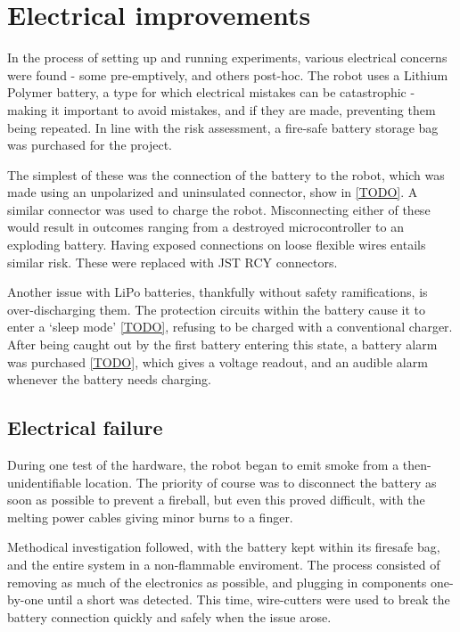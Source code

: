 \documentclass[main.tex]{subfiles}
\begin{document}
\section{Electrical improvements}

In the process of setting up and running experiments, various electrical concerns were found - some pre-emptively, and others post-hoc. The robot uses a Lithium Polymer battery, a type for which electrical mistakes can be catastrophic \cite{bbc-samsung-explosion} - making it important to avoid mistakes, and if they are made, preventing them being repeated. In line with the risk assessment, a fire-safe battery storage bag was purchased for the project.

The simplest of these was the connection of the battery to the robot, which was made using an unpolarized and uninsulated connector, show in \cref{TODO}. A similar connector was used to charge the robot. Misconnecting either of these would result in outcomes ranging from a destroyed microcontroller to an exploding battery. Having exposed connections on loose flexible wires entails similar risk. These were replaced with JST RCY connectors.

Another issue with LiPo batteries, thankfully without safety ramifications, is over-discharging them. The protection circuits within the battery cause it to enter a `sleep mode' \ref{TODO}, refusing to be charged with a conventional charger. After being caught out by the first battery entering this state, a battery alarm was purchased \cref{TODO}, which gives a voltage readout, and an audible alarm whenever the battery needs charging.

\subsection{Electrical failure}

During one test of the hardware, the robot began to emit smoke from a then-unidentifiable location. The priority of course was to disconnect the battery as soon as possible to prevent a fireball, but even this proved difficult, with the melting power cables giving minor burns to a finger.

Methodical investigation followed, with the battery kept within its firesafe bag, and the entire system in a non-flammable enviroment. The process consisted of removing as much of the electronics as possible, and plugging in components one-by-one until a short was detected. This time, wire-cutters were used to break the battery connection quickly and safely when the issue arose.
\end{document}

